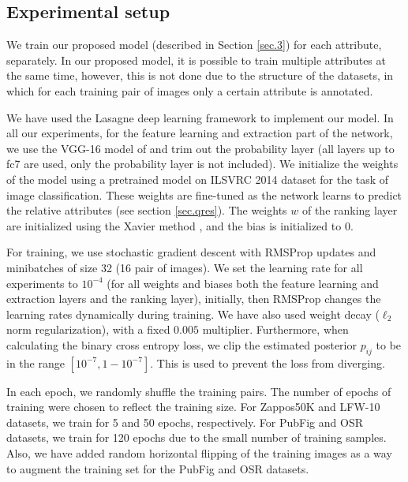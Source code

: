 \subsection{Experimental setup}
We train our proposed model (described in Section \ref{sec.3}) for each attribute, separately. In our proposed model, it is possible  to train multiple attributes at the same time, however, this is not done due to the structure of the datasets, in which for each training pair of images only a certain attribute is annotated.

We have used the Lasagne \cite{lasagne} deep learning framework to implement our model.
In all our experiments, for the feature learning and extraction part of the network,
we use the VGG-16 model of \cite{verydeep} and trim out the probability layer (all layers up to fc7 are used, only the probability layer is not included).
We initialize the weights of the model using a pretrained model on ILSVRC 2014 dataset \cite{ilsvrc2014} for the task of image classification. These weights are fine-tuned as the network learns to predict the relative attributes (see section \ref{sec.qres}). The weights $w$ of the ranking layer are initialized using the Xavier method \cite{glorot}, and the bias is initialized to 0.

For training, we use stochastic gradient descent with RMSProp \cite{Tieleman2012} updates and minibatches of size 32 (16 pair of images).
We set the learning rate for all experiments to $10^{-4}$ (for all weights and biases both the feature learning and extraction layers and the ranking layer), initially, then RMSProp changes the learning rates dynamically during training. We have also used weight decay ($\ell_2$ norm regularization), with a fixed $0.005$ multiplier. Furthermore, when calculating the binary cross entropy loss, we clip the estimated posterior $p_{ij}$ to be in the range $[10^{-7}, 1 - 10^{-7}]$. This is used to prevent the loss from diverging.

In each epoch, we randomly shuffle the training pairs. The number of epochs of training were chosen to reflect the training size. For Zappos50K and LFW-10 datasets, we train for 5 and 50 epochs, respectively. For PubFig and OSR datasets, we train for 120 epochs due to the small number of training samples. Also, we have added random horizontal flipping of the training images as a way to augment the training set for the PubFig and OSR datasets.

